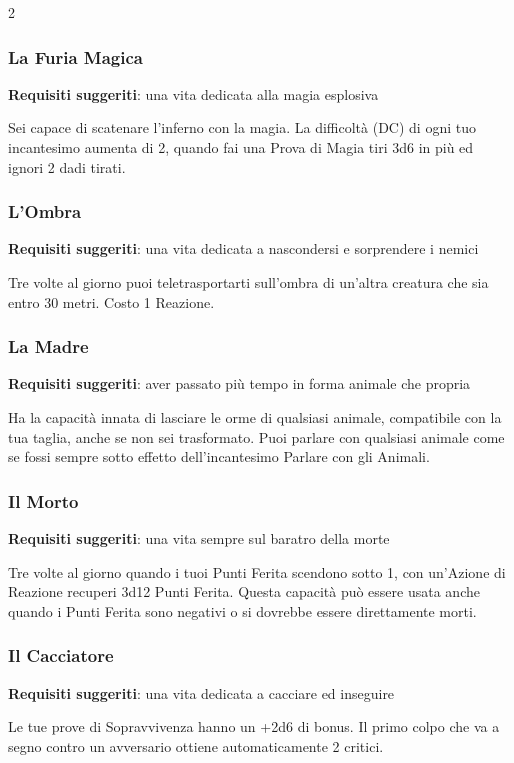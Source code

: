 \begin{multicols}{2}
\subsubsection{La Furia Magica}

\textbf{Requisiti suggeriti}: una vita dedicata alla magia esplosiva

Sei capace di scatenare l'inferno con la magia. La difficoltà (DC) di ogni tuo incantesimo aumenta di 2, quando fai una Prova di Magia tiri 3d6 in più ed ignori 2 dadi tirati.

\subsubsection{L'Ombra}

\textbf{Requisiti suggeriti}: una vita dedicata a nascondersi e sorprendere i nemici

Tre volte al giorno puoi teletrasportarti sull'ombra di un'altra creatura che sia entro 30 metri. Costo 1 Reazione.

\subsubsection{La Madre}

\textbf{Requisiti suggeriti}: aver passato più tempo in forma animale che propria

Ha la capacità innata di lasciare le orme di qualsiasi animale, compatibile con la tua taglia, anche se non sei trasformato. Puoi parlare con qualsiasi animale come se fossi sempre sotto effetto dell'incantesimo Parlare con gli Animali.

\subsubsection{Il Morto}

\textbf{Requisiti suggeriti}: una vita sempre sul baratro della morte

Tre volte al giorno quando i tuoi Punti Ferita scendono sotto 1, con un'Azione di Reazione recuperi 3d12 Punti Ferita. Questa capacità può essere usata anche quando i Punti Ferita sono negativi o si dovrebbe essere direttamente morti.

\subsubsection{Il Cacciatore}

\textbf{Requisiti suggeriti}: una vita dedicata a cacciare ed inseguire

Le tue prove di Sopravvivenza hanno un +2d6 di bonus. Il primo colpo che va a segno contro un avversario ottiene automaticamente 2 critici.

\end{multicols}

\pagebreak

